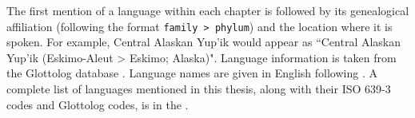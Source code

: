 The first mention of a language within each chapter is followed by its genealogical affiliation (following the format \texttt{family > phylum}) and the location where it is spoken. For example, Central Alaskan Yup'ik would appear as ``Central Alaskan Yup'ik (Eskimo-Aleut > Eskimo; Alaska)". Language information is taken from the Glottolog database \citep{HammarstromForkelHaspelmath2019}. Language names are given in English following \citet{Haspelmath2017}. A complete list of languages mentioned in this thesis, along with their ISO 639-3 codes and Glottolog codes, is in the .
